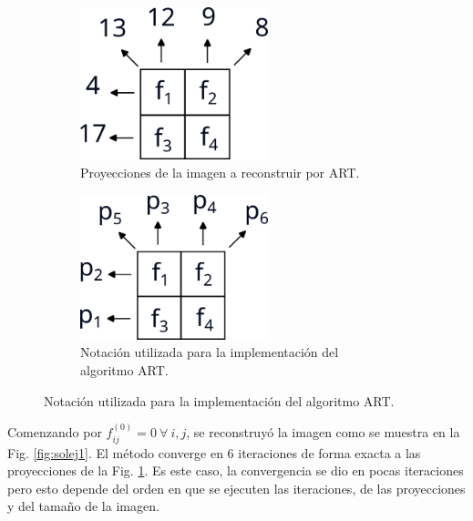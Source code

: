 \documentclass[letterpaper,12pt]{article}
\theoremstyle{plain}
\begin{document}
\begin{figure}[H]
   \centering
   \begin{subfigure}[h]{0.49\linewidth}
      \centering
      \includegraphics[width=0.6\textwidth]{Figuras/enunciado.png}
      \caption{Proyecciones de la imagen a reconstruir por ART.}
      \label{fig:enunciado}
   \end{subfigure}
   \begin{subfigure}[h]{0.49\linewidth}
      \centering
      \includegraphics[width=0.6\textwidth]{Figuras/ej1.png}
      \caption{Notación utilizada para la implementación del algoritmo ART.}
      \label{fig:ej1}
   \end{subfigure}
\end{figure}

Comenzando por $f_{ij}^{(0)} = 0 ~\forall~ i,j$, se reconstruyó la imagen como se muestra en la Fig. \ref{fig:solej1}. El método converge en 6 iteraciones de forma exacta a las proyecciones de la Fig. \ref{fig:enunciado}. Es este caso, la convergencia se dio en pocas iteraciones pero esto depende del orden en que se ejecuten las iteraciones, de las proyecciones y del tamaño de la imagen.
\end{document}
